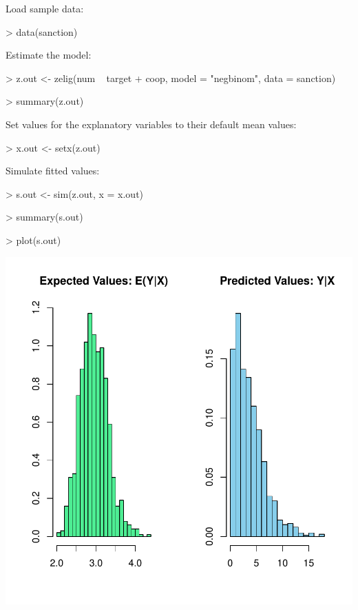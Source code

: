\documentclass{article}
\begin{document}
Load sample data:  
\begin{Schunk}
\begin{Sinput}
> data(sanction)
\end{Sinput}
\end{Schunk}
Estimate the model:  
\begin{Schunk}
\begin{Sinput}
> z.out <- zelig(num ~ target + coop, model = "negbinom", data = sanction)
\end{Sinput}
\end{Schunk}
\begin{Schunk}
\begin{Sinput}
> summary(z.out)
\end{Sinput}
\end{Schunk}
Set values for the explanatory variables to their default mean values:  
\begin{Schunk}
\begin{Sinput}
> x.out <- setx(z.out)
\end{Sinput}
\end{Schunk}
Simulate fitted values:  
\begin{Schunk}
\begin{Sinput}
> s.out <- sim(z.out, x = x.out)
\end{Sinput}
\end{Schunk}
\begin{Schunk}
\begin{Sinput}
> summary(s.out)
\end{Sinput}
\end{Schunk}
\begin{center}
\begin{Schunk}
\begin{Sinput}
> plot(s.out)
\end{Sinput}
\end{Schunk}
\includegraphics{vigpics/negbin-Example1Plot}
\end{center}
\end{document}
